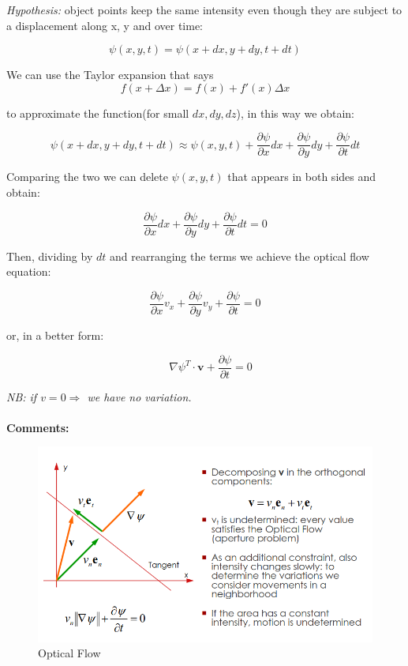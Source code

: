\textit{Hypothesis:} object points keep the same intensity even though they are subject to a displacement along x, y and over time:

\[
    \psi(x,y,t) = \psi(x + dx, y + dy, t + dt)
\]

We can use the Taylor expansion that says \[f(x + \Delta x) =f(x)+f'(x)\Delta x\] 

to approximate the function(for small $dx, dy, dz$), in this way we obtain:

\[
    \psi(x + dx, y + dy, t + dt) \approx \psi(x,y,t) + \frac{\partial \psi}{\partial x}dx + \frac{\partial \psi}{\partial y}dy + \frac{\partial \psi}{\partial t}dt
\]

Comparing the two we can delete $\psi(x,y,t)$ that appears in both sides and obtain: 

\[
    \frac{\partial \psi}{\partial x}dx + \frac{\partial \psi}{\partial y}dy + \frac{\partial \psi}{\partial t}dt = 0
\]

Then, dividing by $dt$ and rearranging the terms we achieve the optical flow equation:

\[
    \frac{\partial \psi}{\partial x}v_x + \frac{\partial \psi}{\partial y}v_y + \frac{\partial \psi}{\partial t} = 0 
\]

or, in a better form:

\[
    \quad \nabla \psi ^{T} \cdot \mathbf{v} + \frac{\partial \psi}{\partial t} = 0
\]

\textit{NB: if $v=0 \Rightarrow$ we have no variation.}\\
\\\textbf{Comments:}
\begin{figure}[H]
    \centering
    \includegraphics[scale=0.45]{Figures/OpticalFlow.png}
    \caption{Optical Flow}
\end{figure}
